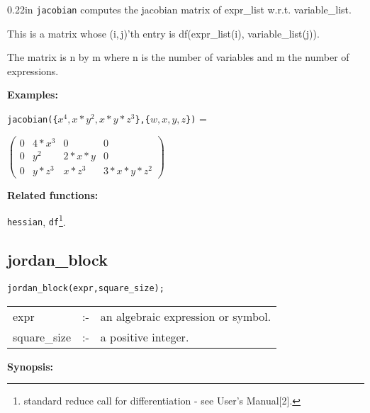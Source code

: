 \begin{addtolength}{\leftskip}{0.22in}
{\tt jacobian} computes the jacobian matrix of expr\_list w.r.t.
variable\_list.

This is a matrix whose (i,$\,$j)'th entry is df(expr\_list(i),
variable\_list(j)).

The matrix is n by m where n is the
                number of variables and m the number of expressions.

\end{addtolength}

{\bf Examples:}

\hspace*{0.175in}
{\tt jacobian(\{$x^4,x*y^2,x*y*z^3$\},\{$w,x,y,z$\})} =

\vspace*{0.1in}

\begin{flushleft}
\hspace*{0.175in}
\begin{math}
\left( \begin{array}{cccc} 0 & 4*x^3 & 0 & 0 \\ 0 & y^2 & 2*x*y & 0 \\
0 & y*z^3 & x*z^3 & 3*x*y*z^2
\end{array} \right)
\end{math}
\end{flushleft}

{\bf Related functions:}

\hspace*{0.175in} {\tt hessian}, {\tt df}\footnote{standard reduce call
for differentiation - see {\REDUCE} User's Manual[2].}.


\subsection{jordan\_block}


\hspace*{0.175in} {\tt jordan\_block(expr,square\_size);}

\hspace*{0.1in}
\begin{tabular}{l l l}
expr        &:-& an algebraic expression or symbol. \\
square\_size &:-& a positive integer.
\end{tabular}

{\bf Synopsis:} %

